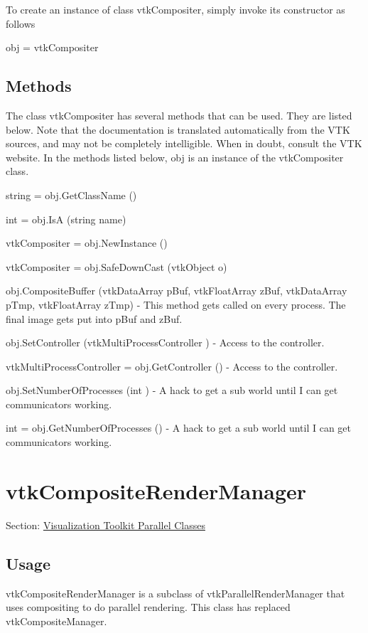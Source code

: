 To create an instance of class vtk\-Compositer, simply invoke its constructor as follows \begin{DoxyVerb}  obj = vtkCompositer
\end{DoxyVerb}
 \hypertarget{vtkwidgets_vtkxyplotwidget_Methods}{}\subsection{Methods}\label{vtkwidgets_vtkxyplotwidget_Methods}
The class vtk\-Compositer has several methods that can be used. They are listed below. Note that the documentation is translated automatically from the V\-T\-K sources, and may not be completely intelligible. When in doubt, consult the V\-T\-K website. In the methods listed below, {\ttfamily obj} is an instance of the vtk\-Compositer class. 
\begin{DoxyItemize}
\item {\ttfamily string = obj.\-Get\-Class\-Name ()}  
\item {\ttfamily int = obj.\-Is\-A (string name)}  
\item {\ttfamily vtk\-Compositer = obj.\-New\-Instance ()}  
\item {\ttfamily vtk\-Compositer = obj.\-Safe\-Down\-Cast (vtk\-Object o)}  
\item {\ttfamily obj.\-Composite\-Buffer (vtk\-Data\-Array p\-Buf, vtk\-Float\-Array z\-Buf, vtk\-Data\-Array p\-Tmp, vtk\-Float\-Array z\-Tmp)} -\/ This method gets called on every process. The final image gets put into p\-Buf and z\-Buf.  
\item {\ttfamily obj.\-Set\-Controller (vtk\-Multi\-Process\-Controller )} -\/ Access to the controller.  
\item {\ttfamily vtk\-Multi\-Process\-Controller = obj.\-Get\-Controller ()} -\/ Access to the controller.  
\item {\ttfamily obj.\-Set\-Number\-Of\-Processes (int )} -\/ A hack to get a sub world until I can get communicators working.  
\item {\ttfamily int = obj.\-Get\-Number\-Of\-Processes ()} -\/ A hack to get a sub world until I can get communicators working.  
\end{DoxyItemize}\hypertarget{vtkparallel_vtkcompositerendermanager}{}\section{vtk\-Composite\-Render\-Manager}\label{vtkparallel_vtkcompositerendermanager}
Section\-: \hyperlink{sec_vtkparallel}{Visualization Toolkit Parallel Classes} \hypertarget{vtkwidgets_vtkxyplotwidget_Usage}{}\subsection{Usage}\label{vtkwidgets_vtkxyplotwidget_Usage}
vtk\-Composite\-Render\-Manager is a subclass of vtk\-Parallel\-Render\-Manager that uses compositing to do parallel rendering. This class has replaced vtk\-Composite\-Manager.

